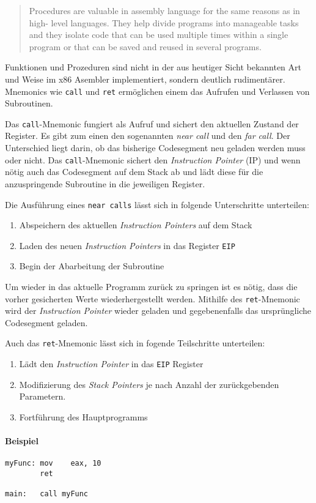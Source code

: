 \begin{quote}Procedures are valuable in assembly language for the same reasons as in high-
level languages. They help divide programs into manageable tasks and they isolate code
that can be used multiple times within a single program or that can be saved and reused
in several programs.
\end{quote}

Funktionen und Prozeduren sind nicht in der aus heutiger Sicht bekannten Art und Weise im x86 Asembler implementiert, sondern deutlich rudimentärer.
Mnemonics wie \texttt{call} und \texttt{ret} ermöglichen einem das Aufrufen und Verlassen von Subroutinen.

Das \texttt{call}-Mnemonic fungiert als Aufruf und sichert den aktuellen Zustand der Register.
Es gibt zum einen den sogenannten \textit{near call} und den \textit{far call}.
Der Unterschied liegt darin, ob das bisherige Codesegment neu geladen werden muss oder nicht.
Das \texttt{call}-Mnemonic sichert den \textit{Instruction Pointer} (IP) und wenn nötig auch das Codesegment auf dem Stack ab und lädt diese für die anzuspringende Subroutine in die jeweiligen Register.

Die Ausführung eines \texttt{near calls} lässt sich in folgende Unterschritte unterteilen:

\begin{enumerate}
	\item Abspeichern des aktuellen \textit{Instruction Pointers} auf dem Stack
	\item Laden des neuen \textit{Instruction Pointers} in das Register \texttt{EIP}
	\item Begin der Abarbeitung der Subroutine	
\end{enumerate}

Um wieder in das aktuelle Programm zurück zu springen ist es nötig, dass die vorher gesicherten Werte wiederhergestellt werden.
Mithilfe des \texttt{ret}-Mnemonic wird der \textit{Instruction Pointer} wieder geladen und gegebenenfalls das ursprüngliche Codesegment geladen.

Auch das \texttt{ret}-Mnemonic lässt sich in fogende Teilschritte unterteilen:
\begin{enumerate}
	\item Lädt den \textit{Instruction Pointer} in das \texttt{EIP} Register
	\item Modifizierung des \textit{Stack Pointers} je nach Anzahl der zurückgebenden Parametern. 
	\item Fortführung des Hauptprogramms 	
\end{enumerate}

\paragraph{Beispiel}
\begin{verbatim}myFunc: mov    eax, 10
        ret

main:   call myFunc
\end{verbatim}
